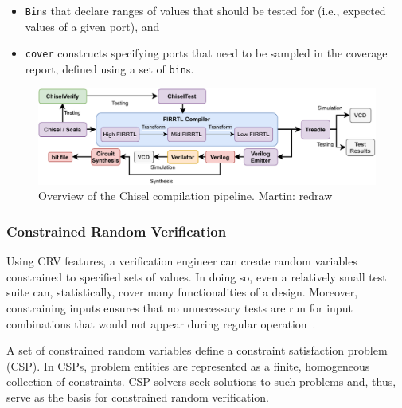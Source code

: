 \documentclass[conference]{IEEEtran}
\newcommand{\martin}[1]{{\color{blue} Martin: #1}}
\begin{document}
\begin{itemize}
  \item \texttt{Bin}s that declare ranges of values that should be tested for (i.e., expected values of a given port), and 
  \item \texttt{cover} constructs specifying ports that need to be sampled in the coverage report, defined using a set of \texttt{bin}s.
\end{itemize}

\begin{figure}
  \centering
    \includegraphics[width=0.8\linewidth]{Chisel_FIRRTL_VERILOG.pdf}
    \caption{Overview of the Chisel compilation pipeline. \martin{redraw}}
\label{fig:chisel-pipe}
\end{figure}

\subsubsection{Constrained Random Verification}

Using CRV features, a verification engineer can create random variables constrained to 
specified sets of values. In doing so, even a relatively small test suite can, statistically, 
cover many functionalities of a design. Moreover, constraining inputs ensures that no 
unnecessary tests are run for input combinations that would not appear during regular 
operation~\cite{MehtaCRV2018}.


A set of constrained random variables define a constraint satisfaction problem (CSP). In CSPs, 
problem entities are represented as a finite, homogeneous collection of constraints. CSP solvers 
seek solutions to such problems and, thus, serve as the basis for constrained random verification.
\end{document}
